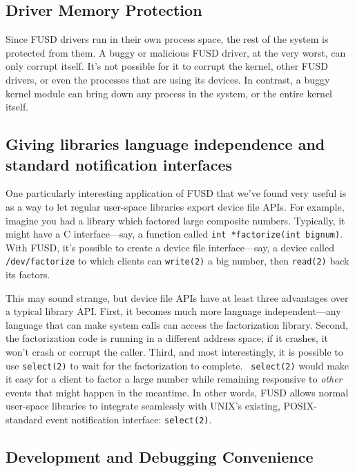 \documentclass{article}
\begin{document}
\subsection{Driver Memory Protection}

Since FUSD drivers run in their own process space, the rest of the
system is protected from them.  A buggy or malicious FUSD driver, at
the very worst, can only corrupt itself.  It's not possible for it to
corrupt the kernel, other FUSD drivers, or even the processes that are
using its devices.  In contrast, a buggy kernel module can bring down
any process in the system, or the entire kernel itself.

\subsection{Giving libraries language independence and standard
notification interfaces}

One particularly interesting application of FUSD that we've found very
useful is as a way to let regular user-space libraries export device
file APIs.  For example, imagine you had a library which factored
large composite numbers.  Typically, it might have a C
interface---say, a function called {\tt int\ *factorize(int\ bignum)}.
With FUSD, it's possible to create a device file interface---say, a
device called {\tt /dev/factorize} to which clients can {\tt write(2)}
a big number, then {\tt read(2)} back its factors.

This may sound strange, but device file APIs have at least three
advantages over a typical library API.  First, it becomes much more
language independent---any language that can make system calls can
access the factorization library.  Second, the factorization code is
running in a different address space; if it crashes, it won't crash or
corrupt the caller.  Third, and most interestingly, it is possible to
use {\tt select(2)} to wait for the factorization to complete.  {\tt
select(2)} would make it easy for a client to factor a large number
while remaining responsive to {\em other} events that might happen in
the meantime.  In other words, FUSD allows normal user-space libraries
to integrate seamlessly with UNIX's existing, POSIX-standard event
notification interface: {\tt select(2)}.

\subsection{Development and Debugging Convenience}
\end{document}
